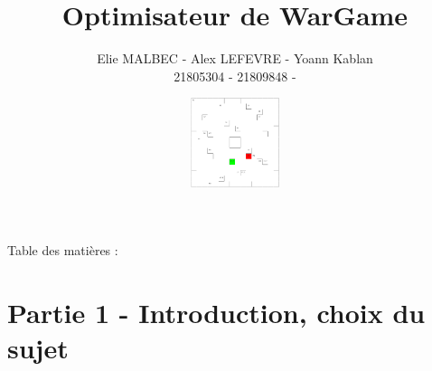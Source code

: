 \documentclass{beamer} %
\title{Optimisateur de WarGame}
\author{Elie MALBEC - Alex LEFEVRE - Yoann Kablan \\
\small{{ 21805304 - 21809848 - }}}
\date{\includegraphics[height=2.6cm, width=10cm]{images/visuBoard.png}}
\institute{Université de Caen Normandie}
\begin{document}
\begin{frame}[plain]
	\titlepage 
\end{frame}

\begin{frame}[plain]
\Large{Table des matières :}
	\tableofcontents[hideallsubsections]
\end{frame}

%
%






\section{Partie 1 - Introduction, choix du sujet}
\end{document}
